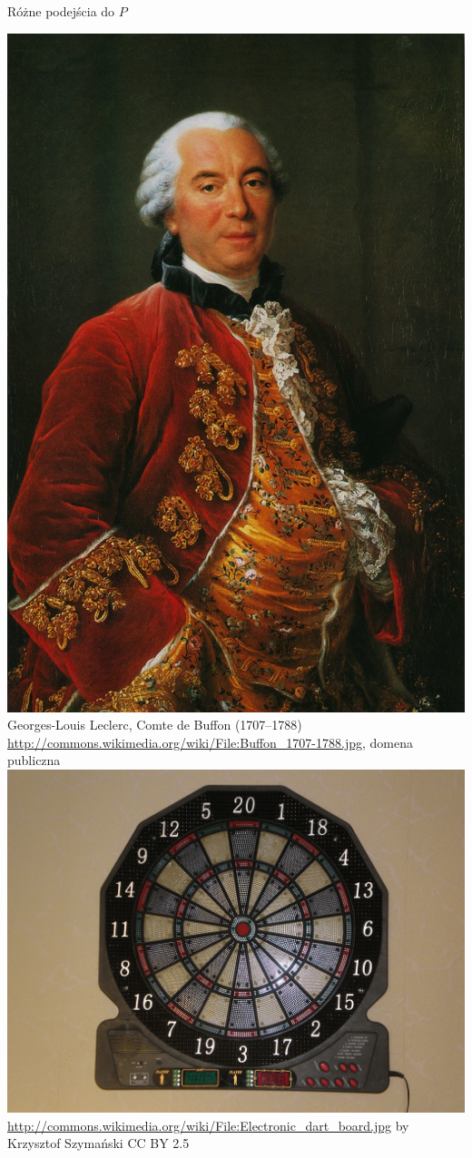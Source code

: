 \documentclass{beamer}
\begin{document}
\begin{frame}{Różne podejścia do $P$}
\begin{center}
{}
{
	\includegraphics[height=.7\textheight]{Buffon_1707-1788.jpg}\\
	Georges-Louis Leclerc, Comte de Buffon (1707--1788)\\
	{\tiny \url{http://commons.wikimedia.org/wiki/File:Buffon_1707-1788.jpg}, domena publiczna}
}
{
	\includegraphics[height=.7\textheight]{Electronic_dart_board.jpg}\\
	{\tiny \url{http://commons.wikimedia.org/wiki/File:Electronic_dart_board.jpg} by Krzysztof Szymański CC BY 2.5}
}
\end{center}
\end{frame}
\end{document}

